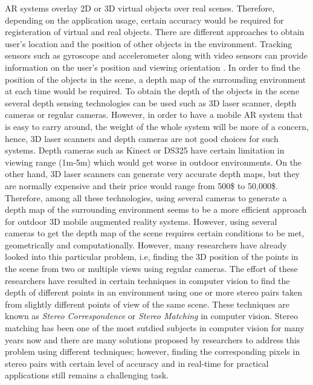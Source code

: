 \documentclass[dvips,letterpaper,12pt]{report}
\begin{document}
AR systems overlay 2D or 3D virtual objects over real scenes. Therefore, depending on the application usage, certain accuracy would be required for 
registeration of virtual and real objects. There are different approaches to obtain user's location and the position of other objects in the environment.
Tracking sensors such as gyroscope and accelerometer along with video sensors can provide information on the user's position and viewing orientation \cite{azum01}.
In order to find the position of the objects in the scene, a depth map of the surrounding environment at each time would be required. To obtain the depth of the 
objects in the scene several depth sensing technologies can be used such as 3D laser scanner, depth cameras or regular cameras. However, in order to have a mobile AR
system that is easy to carry around, the weight of the whole system will be more of a concern, hence, 3D laser scanners and depth cameras are not good choices for such systems.
Depth cameras such as Kinect or DS325 have certain limitation in viewing range (1m-5m) which would get worse in outdoor environments. On the other hand, 3D laser scanners can
generate very accurate depth maps, but they are normally expensive and their price would range from 500\$ to 50,000\$. Therefore, among all these technologies, using several 
cameras to generate a depth map of the surrounding environment seems to be a more efficient approach for outdoor 3D mobile augmented reality systems. {\newline}
However, using several cameras to get the depth map of the scene requires certain conditions to be met, geometrically and computationally. However, many researchers have already looked into
this particular problem, i.e, finding the 3D position of the points in the scene from two or multiple views using regular cameras. The effort of these researchers have resulted in
certain techniques in computer vision to find the depth of different points in an environment using one or more stereo pairs taken from slightly different points of view of the same scene.
These techniques are known as {\it Stereo Correspondence} or {\it Stereo Matching} \cite{sze11} in computer vision. Stereo matching has been one of the most sutdied subjects in computer vision for 
many years now and there are many solutions proposed by researchers to address this problem using different techniques; however, finding the corresponding pixels in stereo pairs with certain level of 
accuracy and in real-time for practical applications still remains a challenging task. {\newline}
\end{document}
